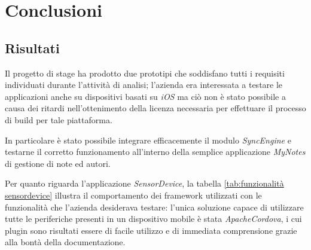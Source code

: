 \chapter{Conclusioni}\label{ch:conclusioni}
\section{Risultati}
Il progetto di stage ha prodotto due prototipi che soddisfano tutti i requisiti individuati durante l'attività di analisi; l'azienda era interessata a testare le applicazioni anche su dispositivi basati su \emph{iOS} ma ciò non è stato possibile a causa dei ritardi nell'ottenimento della licenza necessaria per effettuare il processo di build per tale piattaforma.

In particolare è stato possibile integrare efficacemente il modulo \emph{SyncEngine} e testarne il corretto funzionamento all'interno della semplice applicazione \emph{MyNotes} di gestione di note ed autori.

Per quanto riguarda l'applicazione \emph{SensorDevice}, la tabella \ref{tab:funzionalità sensordevice} illustra il comportamento dei framework utilizzati con le funzionalità che l'azienda desiderava testare: l'unica soluzione capace di utilizzare tutte le periferiche presenti in un dispositivo mobile è stata \emph{ApacheCordova}, i cui plugin sono risultati essere di facile utilizzo e di immediata comprensione grazie alla bontà della documentazione.

